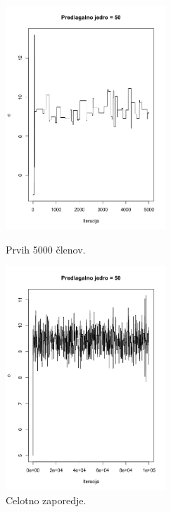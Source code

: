 \documentclass[a4paper,11pt]{article}
\begin{document}
    \begin{figure}[ht!]
        \begin{minipage}{0.5\textwidth}
            \centering
            \includegraphics[width = 60mm]{Slike/4_1f_S_s.png}
            \caption{Prvih 5000 členov.}
        \end{minipage}
        \begin{minipage}{0.5\textwidth}
            \centering
            \includegraphics[width = 60mm]{Slike/4_1f_celotno_s.png}
            \caption{Celotno zaporedje.}
        \end{minipage}
    \end{figure}
\end{document}
